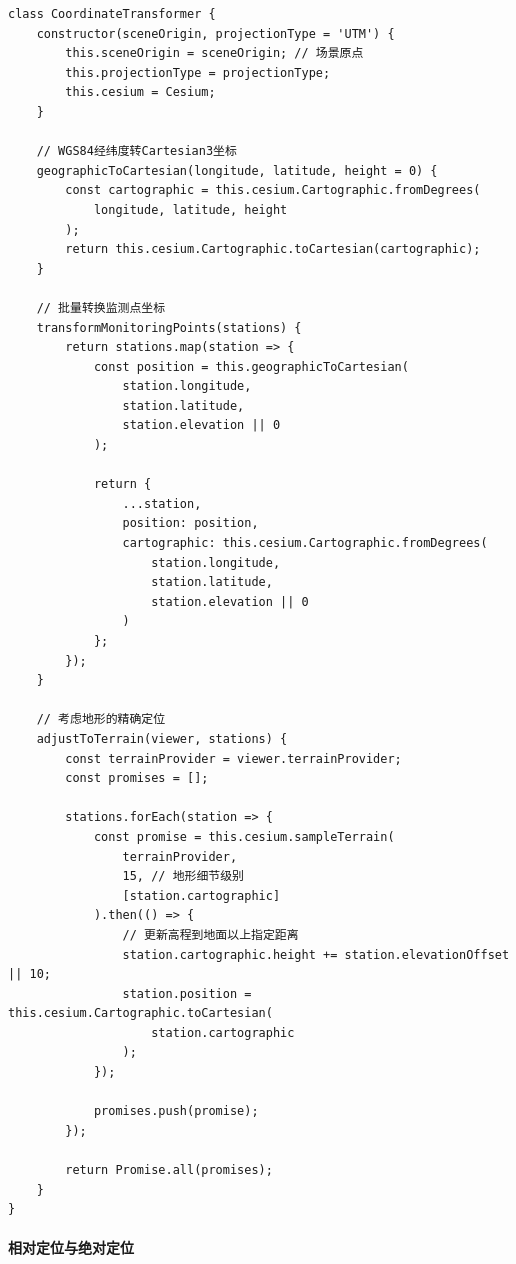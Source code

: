 \begin{lstlisting}
class CoordinateTransformer {
    constructor(sceneOrigin, projectionType = 'UTM') {
        this.sceneOrigin = sceneOrigin; // 场景原点
        this.projectionType = projectionType;
        this.cesium = Cesium;
    }
    
    // WGS84经纬度转Cartesian3坐标
    geographicToCartesian(longitude, latitude, height = 0) {
        const cartographic = this.cesium.Cartographic.fromDegrees(
            longitude, latitude, height
        );
        return this.cesium.Cartographic.toCartesian(cartographic);
    }
    
    // 批量转换监测点坐标
    transformMonitoringPoints(stations) {
        return stations.map(station => {
            const position = this.geographicToCartesian(
                station.longitude,
                station.latitude,
                station.elevation || 0
            );
            
            return {
                ...station,
                position: position,
                cartographic: this.cesium.Cartographic.fromDegrees(
                    station.longitude,
                    station.latitude,
                    station.elevation || 0
                )
            };
        });
    }
    
    // 考虑地形的精确定位
    adjustToTerrain(viewer, stations) {
        const terrainProvider = viewer.terrainProvider;
        const promises = [];
        
        stations.forEach(station => {
            const promise = this.cesium.sampleTerrain(
                terrainProvider,
                15, // 地形细节级别
                [station.cartographic]
            ).then(() => {
                // 更新高程到地面以上指定距离
                station.cartographic.height += station.elevationOffset || 10;
                station.position = this.cesium.Cartographic.toCartesian(
                    station.cartographic
                );
            });
            
            promises.push(promise);
        });
        
        return Promise.all(promises);
    }
}
\end{lstlisting}

\paragraph{相对定位与绝对定位}\label{ux76f8ux5bf9ux5b9aux4f4dux4e0eux7eddux5bf9ux5b9aux4f4d}

